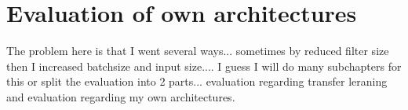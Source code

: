 \section{Evaluation of own architectures}

The problem here is that I went several ways... sometimes by reduced filter size then I increased batchsize and input size.... I guess I will do many subchapters for this or split the evaluation into 2 parts... evaluation regarding transfer leraning and evaluation regarding my own architectures.